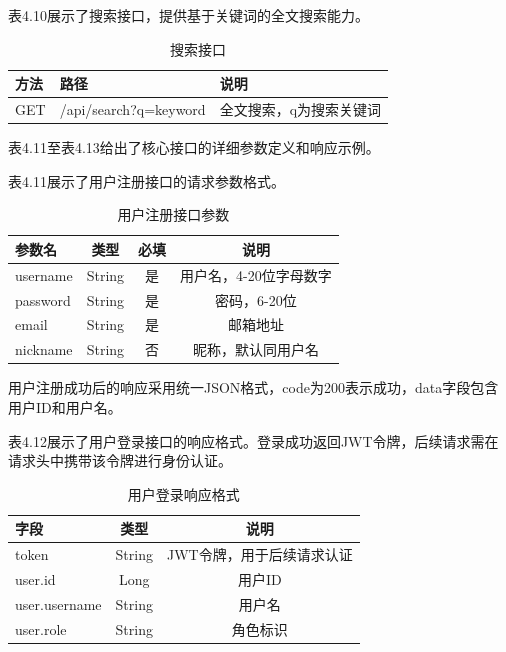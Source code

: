 \documentclass[UTF8,AutoFakeBold=1,AutoFakeSlant,zihao=-4]{SCAU}
\begin{document}
表4.10展示了搜索接口，提供基于关键词的全文搜索能力。

\begin{table}[htbp]
\centering
\caption{搜索接口}
\begin{tabular}{p{2.5cm}p{4.5cm}p{4.5cm}}
\toprule
方法 & 路径 & 说明 \\
\midrule
GET & /api/search?q=keyword & 全文搜索，q为搜索关键词 \\
\bottomrule
\end{tabular}
\end{table}

表4.11至表4.13给出了核心接口的详细参数定义和响应示例。

表4.11展示了用户注册接口的请求参数格式。

\begin{table}[!ht]
\centering
\caption{用户注册接口参数}
\label{tab:register-api}
\begin{tabular}{lccc}
\toprule
\textbf{参数名} & \textbf{类型} & \textbf{必填} & \textbf{说明} \\
\midrule
username & String & 是 & 用户名，4-20位字母数字 \\
password & String & 是 & 密码，6-20位 \\
email & String & 是 & 邮箱地址 \\
nickname & String & 否 & 昵称，默认同用户名 \\
\bottomrule
\end{tabular}
\end{table}

用户注册成功后的响应采用统一JSON格式，code为200表示成功，data字段包含用户ID和用户名。

表4.12展示了用户登录接口的响应格式。登录成功返回JWT令牌，后续请求需在请求头中携带该令牌进行身份认证。

\begin{table}[!ht]
\centering
\caption{用户登录响应格式}
\label{tab:login-response}
\begin{tabular}{lcc}
\toprule
\textbf{字段} & \textbf{类型} & \textbf{说明} \\
\midrule
token & String & JWT令牌，用于后续请求认证 \\
user.id & Long & 用户ID \\
user.username & String & 用户名 \\
user.role & String & 角色标识 \\
\bottomrule
\end{tabular}
\end{table}
\end{document}
